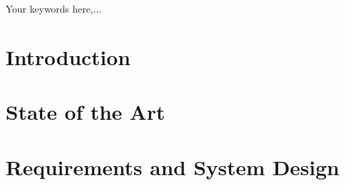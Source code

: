 \documentclass[journal,onecolumn]{IEEEtran}
\begin{document}







\maketitle

\begin{abstract}
Short work summary (around 100 words).
\end{abstract}

\begin{IEEEkeywords}
Your keywords here,...
\end{IEEEkeywords}


%
\IEEEpeerreviewmaketitle



\section{Introduction}
\label{sec:introduction}




\section{State of the Art}
\label{sec:state-of-the-art}


\section{Requirements and System Design}
\label{sec:requirements}
\end{document}
